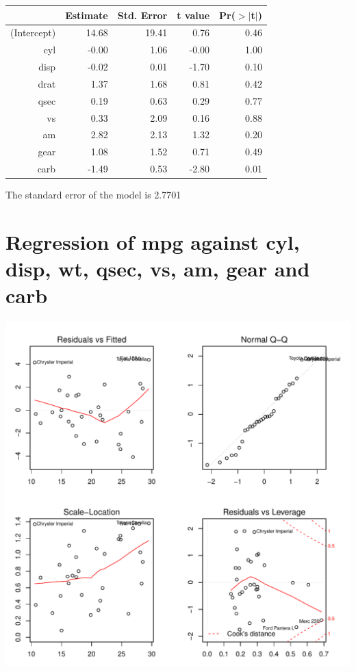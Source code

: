 \documentclass{article}\usepackage[]{graphicx}\usepackage[]{color}
\makeatletter
\def\maxwidth{ %
  \ifdim\Gin@nat@width>\linewidth
    \linewidth
  \else
    \Gin@nat@width
  \fi
}
\newenvironment{knitrout}{}{} %
\makeatother
\begin{document}
\begin{table}[ht]
\centering
\begin{tabular}{rrrrr}
  \hline
 & Estimate & Std. Error & t value & Pr($>$$|$t$|$) \\ 
  \hline
(Intercept) & 14.68 & 19.41 & 0.76 & 0.46 \\ 
  cyl & -0.00 & 1.06 & -0.00 & 1.00 \\ 
  disp & -0.02 & 0.01 & -1.70 & 0.10 \\ 
  drat & 1.37 & 1.68 & 0.81 & 0.42 \\ 
  qsec & 0.19 & 0.63 & 0.29 & 0.77 \\ 
  vs & 0.33 & 2.09 & 0.16 & 0.88 \\ 
  am & 2.82 & 2.13 & 1.32 & 0.20 \\ 
  gear & 1.08 & 1.52 & 0.71 & 0.49 \\ 
  carb & -1.49 & 0.53 & -2.80 & 0.01 \\ 
   \hline
\end{tabular}
\end{table}




The standard error of the model is 2.7701

\newpage

\section{Regression of mpg against cyl, disp, wt, qsec, vs, am, gear and carb }
\begin{knitrout}
\color{fgcolor}

{\centering \includegraphics[width=\maxwidth]{figure/lm-cyl-disp-wt-qsec-vs-am-gear-carb} 

}



\end{knitrout}
\end{document}
